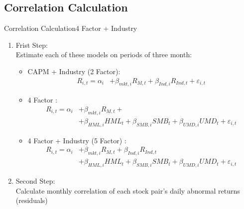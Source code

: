 \documentclass{beamer}
\begin{document}
	
	
	\subsection{Correlation Calculation}
	\begin{frame}{Correlation Calculation}{4 Factor + Industry}
		
		\begin{enumerate}
			\item Frist Step:\\
			\footnotesize
			Estimate each of these models on periods of three month:
			\begin{itemize}
				\item CAPM + Industry (2 Factor): 
				\begin{equation*}
					\begin{split}
						R_{i,t} =\alpha _{i}&+\beta _{mkt,i}{\mathit {R}}_{M,t} + \beta_{Ind,i}{\mathit {R}}_{Ind,t} + \boxed{\varepsilon_{i,t}}
					\end{split}
					\label{e12}
				\end{equation*}
				\item 4 Factor : 
				\begin{equation*}
					\begin{split}
						R_{i,t} =\alpha _{i}&+\beta _{mkt,i}{\mathit {R}}_{M,t} + \\
						&+\beta _{HML,i}{\mathit {HML}}_{t}+\beta _{SMB,i}{\mathit {SMB}}_{t}+\beta _{UMD,i}{\mathit {UMD}}_{t}+ \boxed{\varepsilon_{i,t}}
					\end{split}
					\label{e11}
				\end{equation*}
				
				\item 4 Factor + Industry (5 Factor) : 
				\begin{equation*}
					\begin{split}
						R_{i,t} =\alpha _{i}&+\beta _{mkt,i}{\mathit {R}}_{M,t} + \beta_{Ind,i}{\mathit {R}}_{Ind,t} \\
						&+\beta _{HML,i}{\mathit {HML}}_{t}+\beta _{SMB,i}{\mathit {SMB}}_{t}+\beta _{UMD,i}{\mathit {UMD}}_{t}+ \boxed{\varepsilon_{i,t}}
					\end{split}
					\label{e10}
				\end{equation*}
			\end{itemize}
			\normalsize
			\item Second Step:\\
			\footnotesize
			Calculate monthly correlation of each stock pair’s daily abnormal returns (residuals)
			
		\end{enumerate}
		
	\end{frame}
\end{document}
